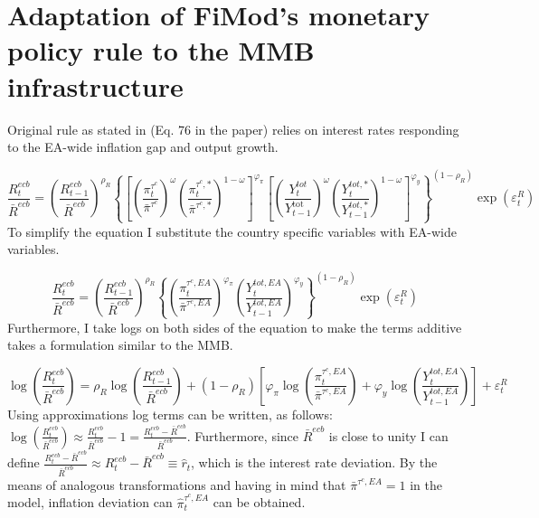 \documentclass{article}
\begin{document}
\section{Adaptation of FiMod's monetary policy rule to the MMB infrastructure}

Original rule as stated in \citet{stahler2012fimod} (Eq. 76 in the
paper) relies on interest rates responding to the EA-wide inflation
gap and output growth.

\begin{equation}
\frac{R_{t}^{ecb}}{\bar{R}^{ecb}}=\left(\frac{R_{t-1}^{ecb}}{\bar{R}^{ecb}}\right)^{\rho_{R}}\left\{ \left[\left(\frac{\pi_{t}^{\tau^{c}}}{\bar{\pi}^{\tau^{c}}}\right)^{\omega}\left(\frac{\pi_{t}^{\tau^{c},*}}{\bar{\pi}^{\tau^{c},*}}\right)^{1-\omega}\right]^{\varphi_{\pi}}\left[\left(\frac{Y_{t}^{tot}}{Y_{t-1}^{\text{tot }}}\right)^{\omega}\left(\frac{Y_{t}^{tot,*}}{Y_{t-1}^{tot,*}}\right)^{1-\omega}\right]^{\varphi_{y}}\right\} ^{\left(1-\rho_{R}\right)}\exp\left(\varepsilon_{t}^{R}\right)\label{eq:originalRule}
\end{equation}
To simplify the equation I substitute the country specific variables
with EA-wide variables.

\[
\frac{R_{t}^{ecb}}{\bar{R}^{ecb}}=\left(\frac{R_{t-1}^{ecb}}{\bar{R}^{ecb}}\right)^{\rho_{R}}\left\{ \left(\frac{\pi_{t}^{\tau^{c},EA}}{\bar{\pi}^{\tau^{c},EA}}\right)^{\varphi_{\pi}}\left(\frac{Y_{t}^{tot,EA}}{Y_{t-1}^{tot,EA}}\right)^{\varphi_{y}}\right\} ^{\left(1-\rho_{R}\right)}\exp\left(\varepsilon_{t}^{R}\right)
\]
Furthermore, I take logs on both sides of the equation to make the
terms additive takes a formulation similar to the MMB.

\[
\log\left(\frac{R_{t}^{ecb}}{\bar{R}^{ecb}}\right)=\rho_{R}\log\left(\frac{R_{t-1}^{ecb}}{\bar{R}^{ecb}}\right)+\left(1-\rho_{R}\right)\left[\varphi_{\pi}\log\left(\frac{\pi_{t}^{\tau^{c},EA}}{\bar{\pi}^{\tau^{c},EA}}\right)+\varphi_{y}\log\left(\frac{Y_{t}^{tot,EA}}{Y_{t-1}^{tot,EA}}\right)\right]+\varepsilon_{t}^{R}
\]
Using approximations log terms can be written, as follows: $\log\left(\frac{R_{t}^{ecb}}{\bar{R}^{ecb}}\right)\approx\frac{R_{t}^{ecb}}{\bar{R}^{ecb}}-1=\frac{R_{t}^{ecb}-\bar{R}^{ecb}}{\bar{R}^{ecb}}$.
Furthermore, since $\bar{R}^{ecb}$ is close to unity I can define
$\frac{R_{t}^{ecb}-\bar{R}^{ecb}}{\bar{R}^{ecb}}\approx R_{t}^{ecb}-\bar{R}^{ecb}\equiv\hat{r}_{t}$,
which is the interest rate deviation. By the means of analogous transformations
and having in mind that $\bar{\pi}^{\tau^{c},EA}=1$ in the model,
inflation deviation can $\hat{\pi}_{t}^{\tau^{c},EA}$ can be obtained.
\end{document}
